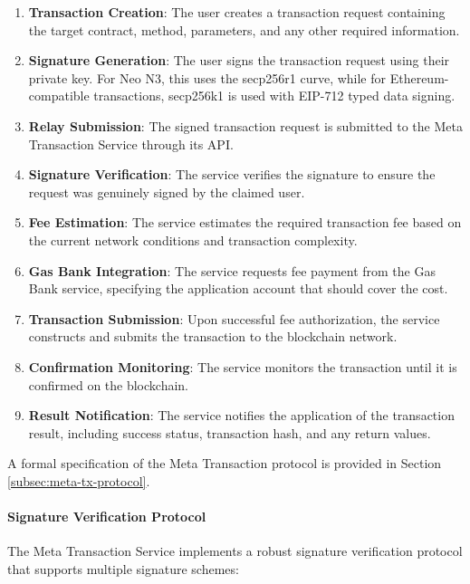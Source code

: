 \begin{enumerate}
    \item \textbf{Transaction Creation}: The user creates a transaction request containing the target contract, method, parameters, and any other required information.
    
    \item \textbf{Signature Generation}: The user signs the transaction request using their private key. For Neo N3, this uses the secp256r1 curve, while for Ethereum-compatible transactions, secp256k1 is used with EIP-712 typed data signing.
    
    \item \textbf{Relay Submission}: The signed transaction request is submitted to the Meta Transaction Service through its API.
    
    \item \textbf{Signature Verification}: The service verifies the signature to ensure the request was genuinely signed by the claimed user.
    
    \item \textbf{Fee Estimation}: The service estimates the required transaction fee based on the current network conditions and transaction complexity.
    
    \item \textbf{Gas Bank Integration}: The service requests fee payment from the Gas Bank service, specifying the application account that should cover the cost.
    
    \item \textbf{Transaction Submission}: Upon successful fee authorization, the service constructs and submits the transaction to the blockchain network.
    
    \item \textbf{Confirmation Monitoring}: The service monitors the transaction until it is confirmed on the blockchain.
    
    \item \textbf{Result Notification}: The service notifies the application of the transaction result, including success status, transaction hash, and any return values.
\end{enumerate}

A formal specification of the Meta Transaction protocol is provided in Section \ref{subsec:meta-tx-protocol}.



\paragraph{Signature Verification Protocol}
The Meta Transaction Service implements a robust signature verification protocol that supports multiple signature schemes:

